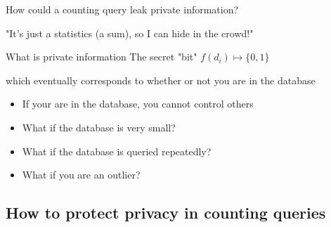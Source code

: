 \documentclass[12pt,aspectratio=169,handout]{beamer}
\begin{document}
\begin{frame}{How could a counting query leak private information?}

"It's just a statistics (a sum), so I can hide in the crowd!"

\begin{block}{What is private information}
The secret "bit" $f(d_i) \mapsto \{0, 1\}$

which eventually corresponds to whether or not you are in the database
\end{block}


\begin{itemize}
\item If your are in the database, you cannot control others
\item What if the database is very small?
\item What if the database is queried repeatedly?
\item What if you are an outlier?
\end{itemize}




\end{frame}



\subsection{How to protect privacy in counting queries}
\end{document}
